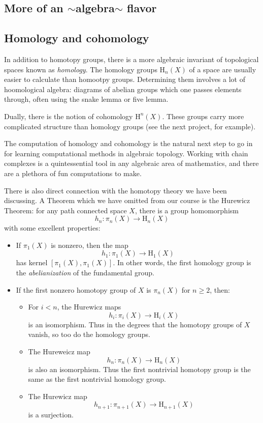 \documentclass[10pt]{amsart}
\theoremstyle{definition}
\newcommand{\cdef}[1]{\textcolor{Bittersweet}{#1}}
\begin{document}
\subsection{More of an $\sim$algebra$\sim$ flavor}
\subsection*{Homology and cohomology}
In addition to homotopy groups, there is a more algebraic invariant of topological spaces known as \cdef{\emph{homology}}. The homology groups $\text{H}_n(X)$ of a space are usually easier to calculate than homootpy groups. Determining them involves a lot of hoomological algebra: diagrams of abelian groups which one passes elements through, often using the snake lemma or five lemma.

Dually, there is the notion of cohomology $\text{H}^n(X)$. These groups carry more complicated structure than homology groups (see the next project, for example). 

The computation of homology and cohomology is the natural next step to go in for learning computational methods in algebraic topology. Working with chain complexes is a quintessential tool in any algebraic area of mathematics, and there are a plethora of fun computations to make.

There is also direct connection with the homotopy theory we have been discussing. A Theorem which we have omitted from our course is the Hurewicz Theorem: for any path connected space $X$, there is a group homomorphism
\[
h_n:\pi_n(X) \to \text{H}_n(X)
\]
with some excellent properties:
\begin{itemize}
    \item If $\pi_1(X)$ is nonzero, then the map
    \[
    h_1:\pi_1(X) \to \text{H}_1(X)
    \]
    has kernel $[\pi_1(X), \pi_1(X)]$. In other words, the first homology group is the \cdef{\emph{abelianization}} of the fundamental group.
    \item If the first nonzero homotopy group of $X$ is $\pi_n(X)$ for $n \geq 2$, then:
    \begin{itemize}
        \item For $i<n$, the Hurewicz maps
        \[
        h_i: \pi_i(X) \to \text{H}_i(X)
        \]
        is an isomorphism. Thus in the degrees that the homotopy groups of $X$ vanish, so too do the homology groups.
        \item The Hureweicz map
        \[
        h_n:\pi_n(X) \to \text{H}_n(X)
        \]
        is also an isomorphism. Thus the first nontrivial homotopy group is the same as the first nontrivial homology group.
        \item The Hurewicz map
        \[
        h_{n+1}:\pi_{n+1}(X) \to \text{H}_{n+1}(X)
        \]
        is a surjection.
    \end{itemize}
\end{itemize}
\end{document}
